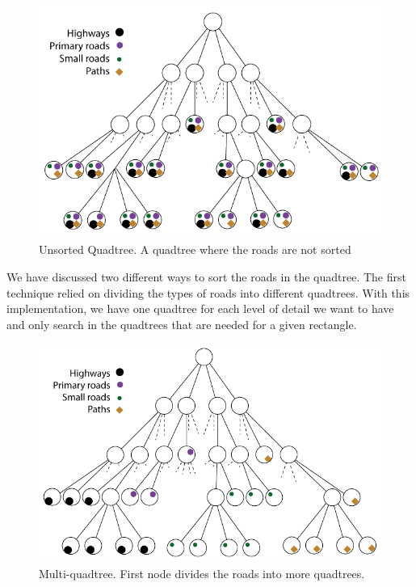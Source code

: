 \begin{figure}[h!]
\centering
\includegraphics[width=1\linewidth]{images/UnsortedQuadtree.png}
\caption{Unsorted Quadtree. A quadtree where the roads are not sorted}
\label{IMPL-USQ}
\end{figure}

We have discussed two different ways to sort the roads in the quadtree. The first technique 
relied on dividing the types of roads into different quadtrees. With this implementation, we
have one quadtree for each level of detail we want to have and only search in the quadtrees
that are needed for a given rectangle.

\begin{figure}[h!]
\centering
\includegraphics[width=1\linewidth]{images/MultiQuadtree.png}
\caption{Multi-quadtree. First node divides the roads into more
quadtrees.}
\label{IMPL-DCQ}
\end{figure}

